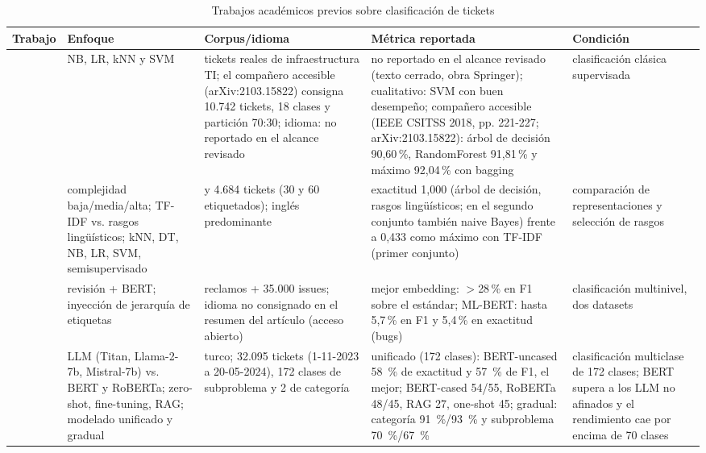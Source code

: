 \begin{table}[!ht]
\centering
\caption{Trabajos académicos previos sobre clasificación de tickets}
\label{tab:trabajos-academicos}
\small
\setlength{\tabcolsep}{4pt}
\begin{tabular}{@{}>{\raggedright\arraybackslash}p{2.0cm} >{\raggedright\arraybackslash}p{3.2cm} >{\raggedright\arraybackslash}p{3.5cm} >{\raggedright\arraybackslash}p{3.8cm} >{\raggedright\arraybackslash}p{2.1cm}@{}}
\toprule
\textbf{Trabajo} & \textbf{Enfoque} & \textbf{Corpus/idioma} & \textbf{Métrica reportada} & \textbf{Condición} \\
\midrule
\textcite{Paramesh2019_it_service_desk} & NB, LR, kNN y SVM & tickets reales de infraestructura TI; el compañero accesible (arXiv:2103.15822) consigna 10.742 tickets, 18 clases y partición 70:30; idioma: no reportado en el alcance revisado & no reportado en el alcance revisado (texto cerrado, obra Springer); cualitativo: SVM con buen desempeño; compañero accesible (IEEE CSITSS 2018, pp. 221-227; arXiv:2103.15822): árbol de decisión 90,60\,\%, RandomForest 91,81\,\% y máximo 92,04\,\% con bagging & clasificación clásica supervisada \\
\textcite{Revina2020_it_tickets} & complejidad baja/media/alta; TF-IDF vs. rasgos lingüísticos; kNN, DT, NB, LR, SVM, semisupervisado & 28.243 y 4.684 tickets (30 y 60 etiquetados); inglés predominante & exactitud 1,000 (árbol de decisión, rasgos lingüísticos; en el segundo conjunto también naive Bayes) frente a 0,433 como máximo con TF-IDF (primer conjunto) & comparación de representaciones y selección de rasgos \\
\textcite{zangari2023ticket} & revisión + BERT; inyección de jerarquía de etiquetas & 20.000 reclamos + 35.000 issues; idioma no consignado en el resumen del artículo (acceso abierto) & mejor embedding: $>$28\,\% en F1 sobre el estándar; ML-BERT: hasta 5,7\,\% en F1 y 5,4\,\% en exactitud (bugs) & clasificación multinivel, dos datasets \\
\textcite{paket2024itservice} & LLM (Titan, Llama-2-7b, Mistral-7b) vs. BERT y RoBERTa; zero-shot, fine-tuning, RAG; modelado unificado y gradual & turco; 32.095 tickets (1-11-2023 a 20-05-2024), 172 clases de subproblema y 2 de categoría & unificado (172 clases): BERT-uncased 58~\% de exactitud y 57~\% de F1, el mejor; BERT-cased 54/55, RoBERTa 48/45, RAG 27, one-shot 45; gradual: categoría 91~\%/93~\% y subproblema 70~\%/67~\% & clasificación multiclase de 172 clases; BERT supera a los LLM no afinados y el rendimiento cae por encima de 70 clases \\

\end{tabular}
\end{table}
